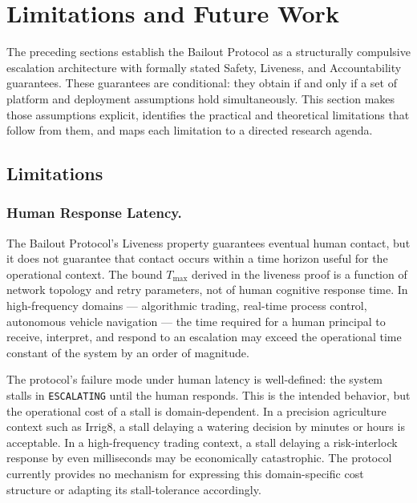 \section{Limitations and Future Work}
\label{sec:limitations}

The preceding sections establish the Bailout Protocol as a structurally compulsive escalation architecture with formally stated Safety, Liveness, and Accountability guarantees. These guarantees are conditional: they obtain if and only if a set of platform and deployment assumptions hold simultaneously. This section makes those assumptions explicit, identifies the practical and theoretical limitations that follow from them, and maps each limitation to a directed research agenda.

\subsection{Limitations}

\subsubsection{Human Response Latency.}
The Bailout Protocol's Liveness property guarantees eventual human contact, but it does not guarantee that contact occurs within a time horizon useful for the operational context. The bound $T_{\max}$ derived in the liveness proof is a function of network topology and retry parameters, not of human cognitive response time. In high-frequency domains --- algorithmic trading, real-time process control, autonomous vehicle navigation --- the time required for a human principal to receive, interpret, and respond to an escalation may exceed the operational time constant of the system by an order of magnitude.

The protocol's failure mode under human latency is well-defined: the system stalls in \texttt{ESCALATING} until the human responds. This is the intended behavior, but the operational cost of a stall is domain-dependent. In a precision agriculture context such as Irrig8, a stall delaying a watering decision by minutes or hours is acceptable. In a high-frequency trading context, a stall delaying a risk-interlock response by even milliseconds may be economically catastrophic. The protocol currently provides no mechanism for expressing this domain-specific cost structure or adapting its stall-tolerance accordingly.

